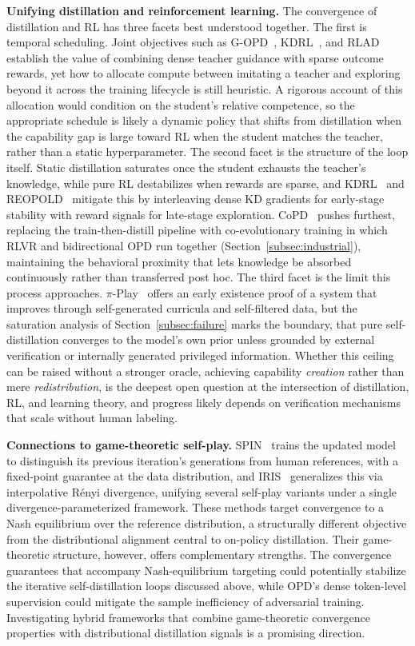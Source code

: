 \documentclass{article} %
\begin{document}
\textbf{Unifying distillation and reinforcement learning.} The convergence of distillation and RL has three facets best understood together. The first is temporal scheduling. Joint objectives such as G-OPD~\citep{2602.12125}, KDRL~\citep{2506.02208}, and RLAD~\citep{2602.22495} establish the value of combining dense teacher guidance with sparse outcome rewards, yet how to allocate compute between imitating a teacher and exploring beyond it across the training lifecycle is still heuristic. A rigorous account of this allocation would condition on the student's relative competence, so the appropriate schedule is likely a dynamic policy that shifts from distillation when the capability gap is large toward RL when the student matches the teacher, rather than a static hyperparameter. The second facet is the structure of the loop itself. Static distillation saturates once the student exhausts the teacher's knowledge, while pure RL destabilizes when rewards are sparse, and KDRL~\citep{2506.02208} and REOPOLD~\citep{2603.11137} mitigate this by interleaving dense KD gradients for early-stage stability with reward signals for late-stage exploration. CoPD~\citep{2604.27083} pushes furthest, replacing the train-then-distill pipeline with co-evolutionary training in which RLVR and bidirectional OPD run together (Section~\ref{subsec:industrial}), maintaining the behavioral proximity that lets knowledge be absorbed continuously rather than transferred post hoc. The third facet is the limit this process approaches. $\pi$-Play~\citep{2604.14054} offers an early existence proof of a system that improves through self-generated curricula and self-filtered data, but the saturation analysis of Section~\ref{subsec:failure} marks the boundary, that pure self-distillation converges to the model's own prior unless grounded by external verification or internally generated privileged information. Whether this ceiling can be raised without a stronger oracle, achieving capability \emph{creation} rather than mere \emph{redistribution}, is the deepest open question at the intersection of distillation, RL, and learning theory, and progress likely depends on verification mechanisms that scale without human labeling.

\textbf{Connections to game-theoretic self-play.} SPIN~\citep{2401.01335} trains the updated model to distinguish its previous iteration's generations from human references, with a fixed-point guarantee at the data distribution, and IRIS~\citep{2604.20933} generalizes this via interpolative R\'{e}nyi divergence, unifying several self-play variants under a single divergence-parameterized framework. These methods target convergence to a Nash equilibrium over the reference distribution, a structurally different objective from the distributional alignment central to on-policy distillation. Their game-theoretic structure, however, offers complementary strengths. The convergence guarantees that accompany Nash-equilibrium targeting could potentially stabilize the iterative self-distillation loops discussed above, while OPD's dense token-level supervision could mitigate the sample inefficiency of adversarial training. Investigating hybrid frameworks that combine game-theoretic convergence properties with distributional distillation signals is a promising direction.
\end{document}
